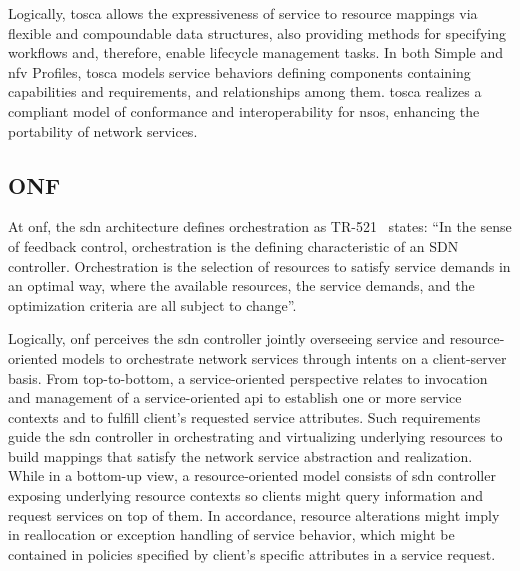 Logically, \gls{tosca} allows the expressiveness of service to resource mappings via flexible and compoundable data structures, also providing methods for specifying workflows and, therefore, enable lifecycle management tasks. In both Simple and \gls{nfv} Profiles, \gls{tosca} models service behaviors defining components containing capabilities and requirements, and relationships among them. \gls{tosca} realizes a compliant model of conformance and interoperability for \glspl{nso}, enhancing the portability of network services. 




\subsection{ONF}
At \gls{onf}, the \gls{sdn} architecture defines orchestration as TR-521~\cite{ONF:Orch:2017} states: ``In the sense of feedback control, orchestration is the defining characteristic of an SDN controller. Orchestration is the selection of resources to satisfy service demands in an optimal way, where the available resources, the service demands, and the optimization criteria are all subject to change''.  

Logically, \gls{onf} perceives the \gls{sdn} controller jointly overseeing service and resource-oriented models to orchestrate network services through intents on a client-server basis. From top-to-bottom, a service-oriented perspective relates to invocation and management of a service-oriented \gls{api} to establish one or more service contexts and to fulfill client's requested service attributes. 
Such requirements guide the \gls{sdn} controller in orchestrating and virtualizing underlying resources to build mappings that satisfy the network service abstraction and realization. While in a bottom-up view, a resource-oriented model consists of \gls{sdn} controller exposing underlying resource contexts so clients might query information and request services on top of them. In accordance, resource alterations might imply in reallocation or exception handling of service behavior, which might be contained in policies specified by client's specific attributes in a service request.

